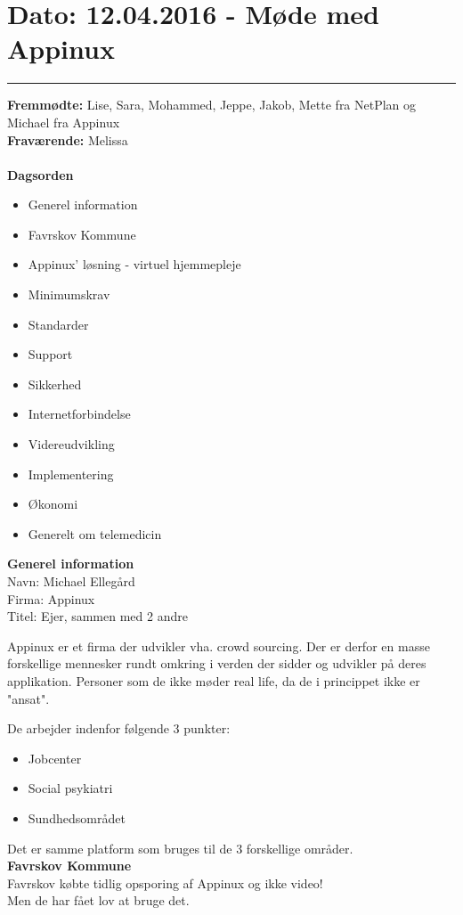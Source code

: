 

\section{Dato: 12.04.2016 - Møde med Appinux}
\hrule

\textbf{Fremmødte:} Lise, Sara, Mohammed, Jeppe, Jakob, Mette fra NetPlan og Michael fra Appinux \\
\textbf{Fraværende:} Melissa 
\\
\\
\textbf{Dagsorden}
\begin{itemize}
	\item Generel information
	\item Favrskov Kommune
	\item Appinux' løsning - virtuel hjemmepleje
	\item Minimumskrav
	\item Standarder
	\item Support
	\item Sikkerhed
	\item Internetforbindelse
	\item Videreudvikling
	\item Implementering
	\item Økonomi
	\item Generelt om telemedicin
\end{itemize}

\textbf{Generel information} 
\\
Navn: Michael Ellegård \\
Firma: Appinux \\
Titel: Ejer, sammen med 2 andre

Appinux er et firma der udvikler vha. crowd sourcing. Der er derfor en masse forskellige mennesker rundt omkring i verden der sidder og udvikler på deres applikation. Personer som de ikke møder real life, da de i princippet ikke er "ansat".

De arbejder indenfor følgende 3 punkter:
\begin{itemize}
	\item Jobcenter 
	\item Social psykiatri
	\item Sundhedsområdet
\end{itemize}
Det er samme platform som bruges til de 3 forskellige områder.\\


\textbf{Favrskov Kommune} 
\\
Favrskov købte tidlig opsporing af Appinux og ikke video!\\
Men de har fået lov at bruge det.

